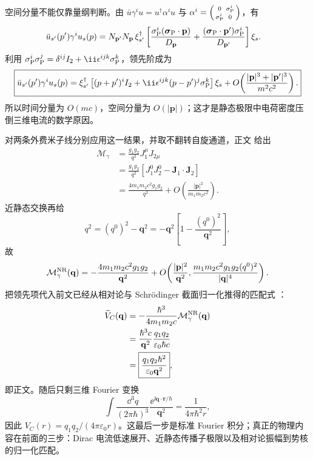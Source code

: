 \begin{derivation}
空间分量不能仅靠量纲判断。由
$\bar u\gamma^iu=u^\dagger\alpha^iu$ 与
$\alpha^i=\begin{psmallmatrix}0&\sigma_{\rm P}^i\\
\sigma_{\rm P}^i&0\end{psmallmatrix}$，有
\begin{align*}
 \bar u_{s'}(p')\gamma^iu_s(p)
 ={}&N_{\mathbf p'}N_{\mathbf p}\,
 \xi_{s'}^\dagger\left[
 \frac{\sigma_{\rm P}^i(\boldsymbol\sigma_{\rm P}\cdot\mathbf p)}{D_{\mathbf p}}
 +\frac{(\boldsymbol\sigma_{\rm P}\cdot\mathbf p')\sigma_{\rm P}^i}{D_{\mathbf p'}}
 \right]\xi_s.
\end{align*}
利用
$\sigma_{\rm P}^i\sigma_{\rm P}^j
=\delta^{ij}I_2+\ii\epsilon^{ijk}\sigma_{\rm P}^k$，领先阶成为
\begin{equation*}
 \boxed{
 \bar u_{s'}(p')\gamma^iu_s(p)
 =\xi_{s'}^\dagger\left[
 (p+p')^i I_2
 +\ii\epsilon^{ijk}(p-p')^j\sigma_{\rm P}^k
 \right]\xi_s
 +O\!\left(\frac{|\mathbf p|^3+|\mathbf p'|^3}{m^2c^2}\right).}
\end{equation*}
所以时间分量为 $O(mc)$，空间分量为 $O(|\mathbf p|)$；这才是静态极限中电荷密度压倒三维电流的数学原因。

对两条外费米子线分别应用这一结果，并取不翻转自旋通道，正文 给出
\begin{align*}
 \mathcal M_\gamma
 &=\frac{g_1g_2}{q^2}
 J_1^\mu J_{2\mu}\\
 &=\frac{g_1g_2}{q^2}
 \left[J_1^0J_2^0-\mathbf J_1\cdot\mathbf J_2\right]\\
 &=\frac{4m_1m_2c^2g_1g_2}{q^2}
 +O\!\left(\frac{|\mathbf p|^2}{m_1m_2c^2}\right).
\end{align*}
近静态交换再给
\begin{equation*}
 q^2=(q^0)^2-\mathbf q^2
 =-\mathbf q^2\left[
 1-\frac{(q^0)^2}{\mathbf q^2}
 \right],
\end{equation*}
故
\begin{equation*}
 \mathcal M_\gamma^{\rm NR}(\mathbf q)
 =-\frac{4m_1m_2c^2g_1g_2}{\mathbf q^2}
 +O\!\left(
 \frac{|\mathbf p|^2}{\mathbf q^2},
 \frac{m_1m_2c^2g_1g_2(q^0)^2}{|\mathbf q|^4}
 \right).
\end{equation*}
把领先项代入前文已经从相对论与 Schrödinger 截面归一化推得的匹配式
：
\begin{align*}
 \widetilde V_C(\mathbf q)
 &=-\frac{\hbar^3}{4m_1m_2c}
 \mathcal M_\gamma^{\rm NR}(\mathbf q)\\
 &=\frac{\hbar^3c}{\mathbf q^2}
 \frac{q_1q_2}{\varepsilon_0\hbar c}\\
 &=\boxed{\frac{q_1q_2\hbar^2}
 {\varepsilon_0\mathbf q^2}},
\end{align*}
即正文。随后只剩三维 Fourier 变换
\begin{equation*}
 \int\frac{\dd^3q}{(2\pi\hbar)^3}
 \frac{\ee^{\ii\mathbf q\cdot\mathbf r/\hbar}}{\mathbf q^2}
 =\frac{1}{4\pi\hbar^2r},
\end{equation*}
因此
$V_C(r)=q_1q_2/(4\pi\varepsilon_0r)$。这最后一步是标准 Fourier 积分；真正的物理内容在前面的三步：Dirac 电流低速展开、近静态传播子极限以及相对论振幅到势核的归一化匹配。
\end{derivation}

